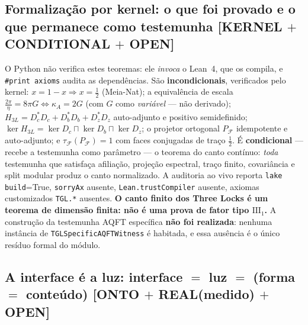 \documentclass[11pt]{article}
\theoremstyle{definition}\newtheorem{deriv}{Derivação}
\begin{document}
\subsection*{Formalização por kernel: o que foi provado e o que permanece como testemunha \textsf{[KERNEL $+$ CONDITIONAL $+$ OPEN]}}

O Python não verifica estes teoremas: ele \emph{invoca} o Lean~4, que os compila, e \texttt{\#print axioms} audita as dependências. São \textbf{incondicionais}, verificados pelo kernel: $x=1-x\Rightarrow x=\tfrac12$ (Meia-Nat); a equivalência de escala $\tfrac{2\pi}{\eta}=8\pi G\iff\kappa_A=2G$ (com $G$ como \emph{variável} --- não derivado); $H_{3L}=D_c^{*}D_c+D_b^{*}D_b+D_z^{*}D_z$ auto-adjunto e positivo semidefinido; $\ker H_{3L}=\ker D_c\sqcap\ker D_b\sqcap\ker D_z$; o projetor ortogonal $P_{\mathcal F}$ idempotente e auto-adjunto; e $\tau_{\mathcal F}(P_{\mathcal F})=1$ com faces conjugadas de traço $\tfrac12$. É \textbf{condicional} --- recebe a testemunha como parâmetro --- o teorema do canto contínuo: \emph{toda} testemunha que satisfaça afiliação, projeção espectral, traço finito, covariância e split modular produz o canto normalizado. A auditoria ao vivo reporta \texttt{lake build}=True, \texttt{sorryAx} ausente, \texttt{Lean.trustCompiler} ausente, axiomas customizados \texttt{TGL.*} ausentes. \textbf{O canto finito dos Three Locks é um teorema de dimensão finita: não é uma prova de fator tipo $\mathrm{III}_1$.} A construção da testemunha AQFT específica \textbf{não foi realizada}: nenhuma instância de \texttt{TGLSpecificAQFTWitness} é habitada, e essa ausência é o único resíduo formal do módulo.

\subsection*{A interface é a luz: interface $=$ luz $=$ (forma $=$ conteúdo) \textsf{[ONTO $+$ REAL(medido) $+$ OPEN]}}
\end{document}
